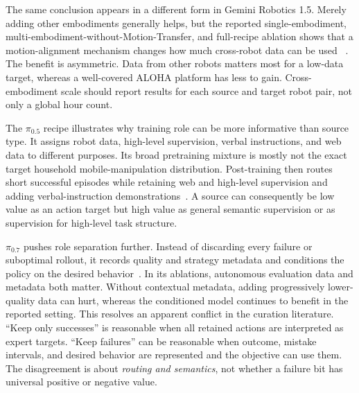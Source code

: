 The same conclusion appears in a different form in Gemini Robotics 1.5.
Merely adding other embodiments generally helps, but the reported single-embodiment, multi-embodiment-without-Motion-Transfer, and full-recipe ablation shows that a motion-alignment mechanism changes how much cross-robot data can be used ~\cite{team2025gemini_2510_03342}.
The benefit is asymmetric.
Data from other robots matters most for a low-data target, whereas a well-covered ALOHA platform has less to gain.
Cross-embodiment scale should report results for each source and target robot pair, not only a global hour count.

The $\pi_{0.5}$ recipe illustrates why training role can be more informative than source type.
It assigns robot data, high-level supervision, verbal instructions, and web data to different purposes.
Its broad pretraining mixture is mostly not the exact target household mobile-manipulation distribution.
Post-training then routes short successful episodes while retaining web and high-level supervision and adding verbal-instruction demonstrations~\cite{intelligence20250_2504_16054}.
A source can consequently be low value as an action target but high value as general semantic supervision or as supervision for high-level task structure.

$\pi_{0.7}$ pushes role separation further.
Instead of discarding every failure or suboptimal rollout, it records quality and strategy metadata and conditions the policy on the desired behavior~\cite{intelligence20260_2604_15483}.
In its ablations, autonomous evaluation data and metadata both matter.
Without contextual metadata, adding progressively lower-quality data can hurt, whereas the conditioned model continues to benefit in the reported setting.
This resolves an apparent conflict in the curation literature.  ``Keep only successes'' is reasonable when all retained actions are interpreted as expert targets.  ``Keep failures'' can be reasonable when outcome, mistake intervals, and desired behavior are represented and the objective can use them.
The disagreement is about \emph{routing and semantics}, not whether a failure bit has universal positive or negative value.

